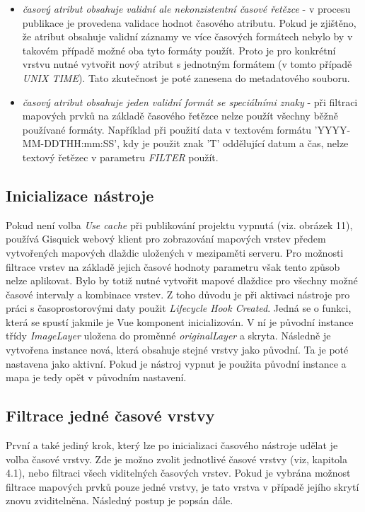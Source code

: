 \begin{itemize}
	\item\textit{časový atribut obsahuje validní ale
	nekonzistentní časové řetězce} - v procesu publikace je
	provedena validace hodnot časového atributu. Pokud je
	zjištěno, že atribut obsahuje validní záznamy ve více časových
	formátech nebylo by v takovém případě možné oba tyto formáty
	použít. Proto je pro konkrétní vrstvu nutné vytvořit nový
	atribut s jednotným formátem (v tomto případě \textit{UNIX
	TIME}). Tato zkutečnost je poté zanesena do metadatového
	souboru.
        \item\textit{časový atribut obsahuje jeden validní
	formát se speciálními znaky} - při filtraci mapových prvků na
	základě časového řetězce nelze použít všechny běžně používané
	formáty. Například při použití data v textovém formátu
	'YYYY-MM-DDTHH:mm:SS', kdy je použit znak 'T' oddělující datum
	a čas, nelze textový řetězec v parametru \textit{FILTER}
	použít.
\end{itemize}

\subsection{Inicializace nástroje}

Pokud není volba \textit{Use cache} při publikování projektu vypnutá
(viz. obrázek 11), používá Gisquick webový klient pro zobrazování
mapových vrstev předem vytvořených mapových dlaždic uložených v
mezipaměti serveru. Pro možnosti filtrace vrstev na základě jejich
časové hodnoty parametru však tento způsob nelze aplikovat. Bylo by
totiž nutné vytvořit mapové dlaždice pro všechny možné časové
intervaly a kombinace vrstev. Z toho důvodu je při aktivaci nástroje
pro práci s časoprostorovými daty použit \textit{Lifecycle Hook
Created}. Jedná se o funkci, která se spustí jakmile je Vue komponent
inicializován. V ní je původní instance třídy \textit{ImageLayer}
uložena do proměnné \textit{originalLayer} a skryta. Následně je
vytvořena instance nová, která obsahuje stejné vrstvy jako původní. Ta
je poté nastavena jako aktivní. Pokud je nástroj vypnut je použita
původní instance a mapa je tedy opět v původním nastavení.

\subsection{Filtrace jedné časové vrstvy}

První a také jediný krok, který lze po inicializaci časového nástroje
udělat je volba časové vrstvy. Zde je možno zvolit jednotlivé časové
vrstvy (viz, kapitola 4.1), nebo filtraci všech viditelných časových
vrstev. Pokud je vybrána možnost filtrace mapových prvků pouze jedné
vrstvy, je tato vrstva v případě jejího skrytí znovu
zviditelněna. Následný postup je popsán dále.

